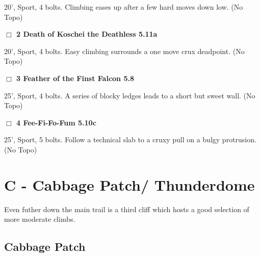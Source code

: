 \begin{multicols}{2}
\begin{adjustwidth}{1.3em}{}
20', Sport, 4 bolts. Climbing eases up after a few hard moves down low.
  (No Topo)
\end{adjustwidth}




\needspace{2em}
\label{rt:Death of Koschei the Deathless}
\colorbox{RoyalBlue!20}{
\parbox{0.95\linewidth}{
\hspace{-1ex}\textbf{$\Box$
2 Death of Koschei the Deathless 5.11a  
}}}
\begin{adjustwidth}{1.3em}{}			

20', Sport, 4 bolts. Easy climbing surrounds a one move crux deadpoint.
  (No Topo)
\end{adjustwidth}




\needspace{2em}
\label{rt:Feather of the Finst Falcon}
\colorbox{green!20}{
\parbox{0.95\linewidth}{
\hspace{-1ex}\textbf{$\Box$
3 Feather of the Finst Falcon 5.8  
}}}
\begin{adjustwidth}{1.3em}{}			

25', Sport, 4 bolts. A series of blocky ledges leads to a short but sweet wall.
  (No Topo)
\end{adjustwidth}




\needspace{2em}
\label{rt:Fee-Fi-Fo-Fum}
\colorbox{RoyalBlue!20}{
\parbox{0.95\linewidth}{
\hspace{-1ex}\textbf{$\Box$
4 Fee-Fi-Fo-Fum 5.10c  
}}}
\begin{adjustwidth}{1.3em}{}			

25', Sport, 5 bolts. Follow a technical slab to a cruxy pull on a bulgy protrusion.
  (No Topo)
\end{adjustwidth}





\newpage

\section{C - Cabbage Patch/ Thunderdome}\label{sa:Cabbage Patch/ Thunderdome}

Even futher down the main trail is a third cliff which hosts a good selection of more moderate climbs.\\




\needspace{10em}
\subsection*{Cabbage Patch}\label{bf:Cabbage Patch}





\end{multicols}
